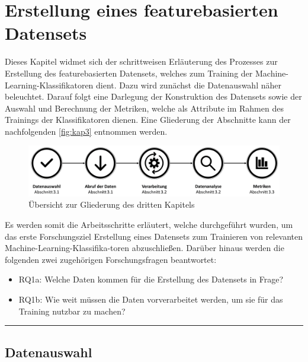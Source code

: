 
\chapter{Erstellung eines featurebasierten Datensets}
\label{dataset-creation}

Dieses Kapitel widmet sich der schrittweisen Erläuterung des Prozesses zur Erstellung des featurebasierten Datensets, welches zum Training der Machine-Learning-Klassifikatoren dient. Dazu wird zunächst die Datenauswahl näher beleuchtet. Darauf folgt eine Darlegung der Konstruktion des Datensets sowie der Auswahl und Berechnung der Metriken, welche als Attribute im Rahmen des Trainings der Klassifikatoren dienen. Eine Gliederung der Abschnitte kann der nachfolgenden \autoref{fig:kap3} entnommen werden.

\begin{figure}[H]
    \centering
    \includegraphics[width=\textwidth]{images/Kap3}
    \caption{Übersicht zur Gliederung des dritten Kapitels\label{fig:kap3}}
\end{figure}

Es werden somit die Arbeitsschritte erläutert, welche durchgeführt wurden, um das erste Forschungsziel \glqq Erstellung eines Datensets zum Trainieren von relevanten Machine-Learning-Klassifika-toren\grqq{} abzuschließen. Darüber hinaus werden die folgenden zwei zugehörigen Forschungsfragen beantwortet:
\vspace{-\topsep}
\begin{itemize}
\setlength{\itemsep}{-2pt}
\item RQ1a: Welche Daten kommen für die Erstellung des Datensets in Frage?
\item RQ1b: Wie weit müssen die Daten vorverarbeitet werden, um sie für das Training nutzbar
zu machen?
\end{itemize}
\smallskip
\hrule

\section{Datenauswahl}

